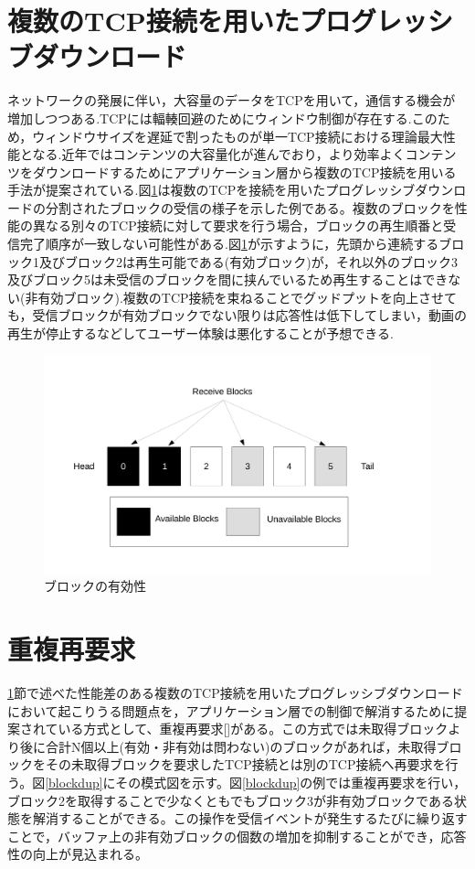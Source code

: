 \documentclass[a4j,12pt]{gradthesis_utf8}
\begin{document}
 \section{複数のTCP接続を用いたプログレッシブダウンロード}
 \label{hukusu}
 ネットワークの発展に伴い，大容量のデータをTCPを用いて，通信する機会が増加しつつある.TCPには輻輳回避のためにウィンドウ制御が存在する.このため，ウィンドウサイズを遅延で割ったものが単一TCP接続における理論最大性能となる.近年ではコンテンツの大容量化が進んでおり，より効率よくコンテンツをダウンロードするためにアプリケーション層から複数のTCP接続を用いる手法が提案されている.図\ref{block}は複数のTCPを接続を用いたプログレッシブダウンロードの分割されたブロックの受信の様子を示した例である。複数のブロックを性能の異なる別々のTCP接続に対して要求を行う場合，ブロックの再生順番と受信完了順序が一致しない可能性がある.図\ref{block}が示すように，先頭から連続するブロック1及びブロック2は再生可能である(有効ブロック)が，それ以外のブロック3及びブロック5は未受信のブロックを間に挟んでいるため再生することはできない(非有効ブロック).複数のTCP接続を束ねることでグッドプットを向上させても，受信ブロックが有効ブロックでない限りは応答性は低下してしまい，動画の再生が停止するなどしてユーザー体験は悪化することが予想できる.
\begin{figure}[h]
\centering
\includegraphics[width=18cm]{block.pdf}
\caption{ブロックの有効性}
\label{block}
\end{figure}

 \section{重複再要求}
 \label{juhuku}
 \ref{hukusu}節で述べた性能差のある複数のTCP接続を用いたプログレッシブダウンロードにおいて起こりうる問題点を，アプリケーション層での制御で解消するために提案されている方式として、重複再要求[]がある。この方式では未取得ブロックより後に合計N個以上(有効・非有効は問わない)のブロックがあれば，未取得ブロックをその未取得ブロックを要求したTCP接続とは別のTCP接続へ再要求を行う。図\ref{blockdup}にその模式図を示す。図\ref{blockdup}の例では重複再要求を行い，ブロック2を取得することで少なくともでもブロック3が非有効ブロックである状態を解消することができる。この操作を受信イベントが発生するたびに繰り返すことで，バッファ上の非有効ブロックの個数の増加を抑制することができ，応答性の向上が見込まれる。
 
\end{document}
